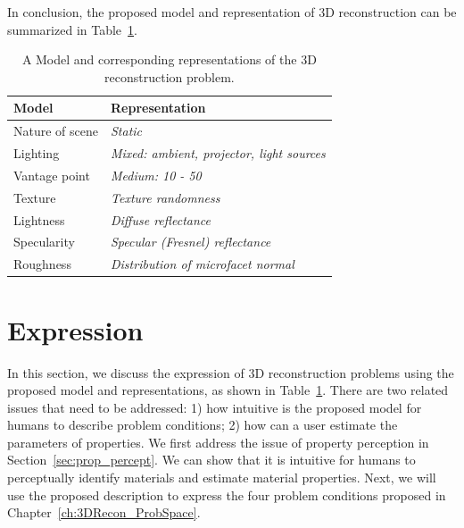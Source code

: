 In conclusion, the proposed model and representation of 3D reconstruction can be summarized in Table~\ref{tab:3DRecon_model_repre}.
\begin{table}[!htbp]
  \centering
  \begin{tabular}{l|l}
  \toprule
  \textbf{Model} & \textbf{Representation}\\
  \midrule
  Nature of scene & \textit{Static} \\
  Lighting & \textit{Mixed: ambient, projector, light sources} \\
  Vantage point & \textit{Medium: 10 - 50} \\
  Texture & \textit{Texture randomness}\\
  Lightness & \textit{Diffuse reflectance}\\
  Specularity & \textit{Specular (Fresnel) reflectance}\\
  Roughness & \textit{Distribution of microfacet normal}\\
  \bottomrule
  \end{tabular}
  \caption{A Model and corresponding representations of the 3D reconstruction problem.}
  \label{tab:3DRecon_model_repre}
\end{table}

\section{Expression}
\label{sec:3DRecon_Exp}
In this section, we discuss the expression of 3D reconstruction problems using the proposed model and representations, as shown in Table~\ref{tab:3DRecon_model_repre}. There are two related issues that need to be addressed: 1) how intuitive is the proposed model for humans to describe problem conditions; 2) how can a user estimate the parameters of properties. We first address the issue of property perception in Section~\ref{sec:prop_percept}. We can show that it is intuitive for humans to perceptually identify materials and estimate material properties. Next, we will use the proposed description to express the four problem conditions proposed in Chapter~\ref{ch:3DRecon_ProbSpace}.

